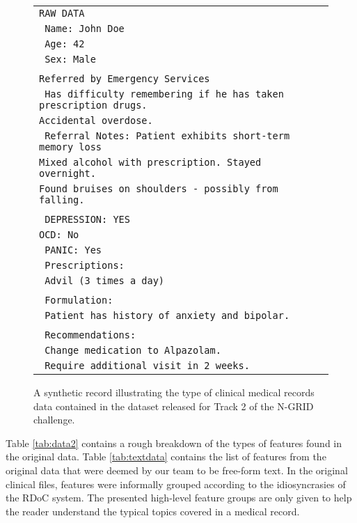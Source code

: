 \begin{figure}[t]
\begin{tabular}{|l|}
\hline
\texttt{RAW DATA}\\
\texttt{    Name: John Doe}\\
  \texttt{  Age: 42}\\
\texttt{    Sex: Male}\\
\\
    \texttt{Referred by Emergency Services}
\\    
\texttt{    Has difficulty remembering if he has taken prescription drugs.}\\ \texttt{Accidental overdose.}
\\    
\texttt{    Referral Notes: Patient exhibits short-term memory loss}\\
\texttt{Mixed alcohol with
    prescription. Stayed overnight.}\\
\texttt{Found bruises on shoulders - possibly from falling.}\\
\\   
  \texttt{  DEPRESSION: YES} \\
  \texttt{OCD: No}
\\
\texttt{    PANIC: Yes}
\\    
\texttt{    Prescriptions:}\\
    \texttt{ Advil (3 times a day)}\\
\\         
\texttt{    Formulation:}
\\
\texttt{    Patient has history of anxiety and bipolar.}\\
\\    
\texttt{    Recommendations:}
\\
\texttt{    Change medication to Alpazolam.}
\\
\texttt{    Require additional visit in 2 weeks.}
\\    
\hline
\end{tabular}
\caption{A synthetic record illustrating the type of clinical medical records data contained in the
dataset released for Track 2 of the N-GRID challenge.}
\label{fig:sampleRecord}
\end{figure}

Table \ref{tab:data2} contains a rough breakdown of the types of features found in the original data. Table \ref{tab:textdata} contains the list of features from the original data that were deemed by our team to be free-form text. In the original clinical files, features were informally grouped according to the idiosyncrasies of the RDoC system. The presented high-level feature groups are only given to help the reader understand the typical topics covered in a medical record.


